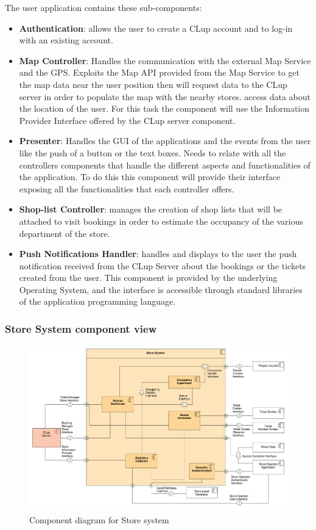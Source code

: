 The user application contains these sub-components:
\begin{itemize}
    \item \textbf{Authentication}: allows the user to create a CLup account and to log-in with an existing account.
    \item \textbf{Map Controller}: Handles the communication with the external Map Service and the GPS. Exploits the Map API provided from the Map Service to get the map data near the user position then will request data to the CLup server in order to populate the map with the nearby stores.  access data about the location of the user. For this task the component will use the Information Provider Interface offered by the CLup server component.
    \item \textbf{Presenter}: Handles the GUI of the applications and the events from the user like the push of a button or the text boxes. Needs to relate with all the controllers components that handle the different aspects and functionalities of the application. To do this this component will provide their interface exposing all the functionalities that each controller offers.
    \item \textbf{Shop-list Controller}: manages the creation of shop lists that will be attached to visit bookings in order to estimate the occupancy of the various department of the store.
    \item \textbf{Push Notifications Handler}: handles and displays to the user the push notification received from the CLup Server about the bookings or the tickets created from the user. This component is provided by the underlying Operating System, and the interface is accessible through standard libraries of the application programming language.
\end{itemize}

\subsubsection{Store System component view}
\begin{figure}[H]
    \includegraphics[width=\textwidth]{Images/UML_store_system_component.pdf}
    \caption{\label{fig:UML_comp_CLup_store_system}Component diagram for Store system}
\end{figure}

